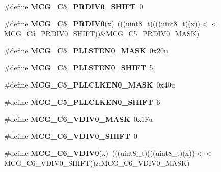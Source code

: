 \begin{DoxyCompactItemize}
\#define {\bfseries M\+C\+G\+\_\+\+C5\+\_\+\+P\+R\+D\+I\+V0\+\_\+\+S\+H\+I\+FT}~0
\item 
\mbox{\label{group___m_c_g___register___masks_gaff29a787086eaba9ef46f4e873d83a54}} 
\#define {\bfseries M\+C\+G\+\_\+\+C5\+\_\+\+P\+R\+D\+I\+V0}(x)~(((uint8\+\_\+t)(((uint8\+\_\+t)(x))$<$$<$M\+C\+G\+\_\+\+C5\+\_\+\+P\+R\+D\+I\+V0\+\_\+\+S\+H\+I\+FT))\&M\+C\+G\+\_\+\+C5\+\_\+\+P\+R\+D\+I\+V0\+\_\+\+M\+A\+SK)
\item 
\mbox{\label{group___m_c_g___register___masks_ga9bec4ed23caf6a431b506e944d928080}} 
\#define {\bfseries M\+C\+G\+\_\+\+C5\+\_\+\+P\+L\+L\+S\+T\+E\+N0\+\_\+\+M\+A\+SK}~0x20u
\item 
\mbox{\label{group___m_c_g___register___masks_ga486796db598fbf2f07f39d71453f49b6}} 
\#define {\bfseries M\+C\+G\+\_\+\+C5\+\_\+\+P\+L\+L\+S\+T\+E\+N0\+\_\+\+S\+H\+I\+FT}~5
\item 
\mbox{\label{group___m_c_g___register___masks_ga73671453b8f8804784e5b7e67551726d}} 
\#define {\bfseries M\+C\+G\+\_\+\+C5\+\_\+\+P\+L\+L\+C\+L\+K\+E\+N0\+\_\+\+M\+A\+SK}~0x40u
\item 
\mbox{\label{group___m_c_g___register___masks_gaa66ceed70e1055a31e46c60a502b8eb7}} 
\#define {\bfseries M\+C\+G\+\_\+\+C5\+\_\+\+P\+L\+L\+C\+L\+K\+E\+N0\+\_\+\+S\+H\+I\+FT}~6
\item 
\mbox{\label{group___m_c_g___register___masks_gacf93ac207865bd372d9148f10dce7267}} 
\#define {\bfseries M\+C\+G\+\_\+\+C6\+\_\+\+V\+D\+I\+V0\+\_\+\+M\+A\+SK}~0x1\+Fu
\item 
\mbox{\label{group___m_c_g___register___masks_ga92208f56fc7ce68a0a8ff14ab5c3b2f6}} 
\#define {\bfseries M\+C\+G\+\_\+\+C6\+\_\+\+V\+D\+I\+V0\+\_\+\+S\+H\+I\+FT}~0
\item 
\mbox{\label{group___m_c_g___register___masks_ga50b2068270153c3013b4e0ac2256fbfd}} 
\#define {\bfseries M\+C\+G\+\_\+\+C6\+\_\+\+V\+D\+I\+V0}(x)~(((uint8\+\_\+t)(((uint8\+\_\+t)(x))$<$$<$M\+C\+G\+\_\+\+C6\+\_\+\+V\+D\+I\+V0\+\_\+\+S\+H\+I\+FT))\&M\+C\+G\+\_\+\+C6\+\_\+\+V\+D\+I\+V0\+\_\+\+M\+A\+SK)

\end{DoxyCompactItemize}
